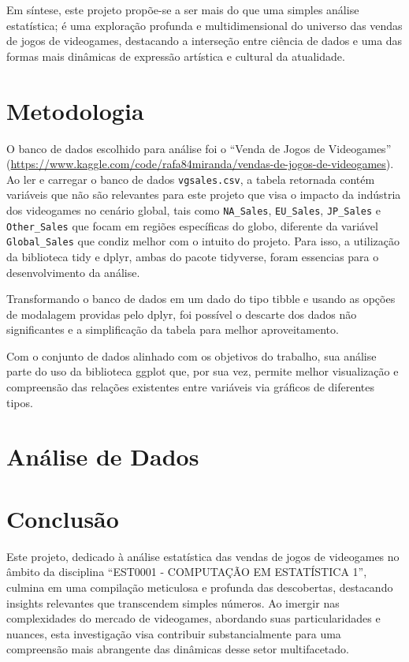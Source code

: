 \documentclass[draft]{agujournal2018}
\begin{document}
Em síntese, este projeto propõe-se a ser mais do que uma simples análise
estatística; é uma exploração profunda e multidimensional do universo
das vendas de jogos de videogames, destacando a interseção entre ciência
de dados e uma das formas mais dinâmicas de expressão artística e
cultural da atualidade.

\section{Metodologia}

O banco de dados escolhido para análise foi o ``Venda de Jogos de
Videogames''
(\url{https://www.kaggle.com/code/rafa84miranda/vendas-de-jogos-de-videogames}).
Ao ler e carregar o banco de dados \texttt{vgsales.csv}, a tabela
retornada contém variáveis que não são relevantes para este projeto que
visa o impacto da indústria dos videogames no cenário global, tais como
\texttt{NA\_Sales}, \texttt{EU\_Sales}, \texttt{JP\_Sales} e
\texttt{Other\_Sales} que focam em regiões específicas do globo,
diferente da variável \texttt{Global\_Sales} que condiz melhor com o
intuito do projeto. Para isso, a utilização da biblioteca tidy e dplyr,
ambas do pacote tidyverse, foram essencias para o desenvolvimento da
análise.

Transformando o banco de dados em um dado do tipo tibble e usando as
opções de modalagem providas pelo dplyr, foi possível o descarte dos
dados não significantes e a simplificação da tabela para melhor
aproveitamento.

Com o conjunto de dados alinhado com os objetivos do trabalho, sua
análise parte do uso da biblioteca ggplot que, por sua vez, permite
melhor visualização e compreensão das relações existentes entre
variáveis via gráficos de diferentes tipos.

\section{Análise de Dados}

\section{Conclusão}

Este projeto, dedicado à análise estatística das vendas de jogos de
videogames no âmbito da disciplina ``EST0001 - COMPUTAÇÃO EM ESTATÍSTICA
1'', culmina em uma compilação meticulosa e profunda das descobertas,
destacando insights relevantes que transcendem simples números. Ao
imergir nas complexidades do mercado de videogames, abordando suas
particularidades e nuances, esta investigação visa contribuir
substancialmente para uma compreensão mais abrangente das dinâmicas
desse setor multifacetado.
\end{document}
